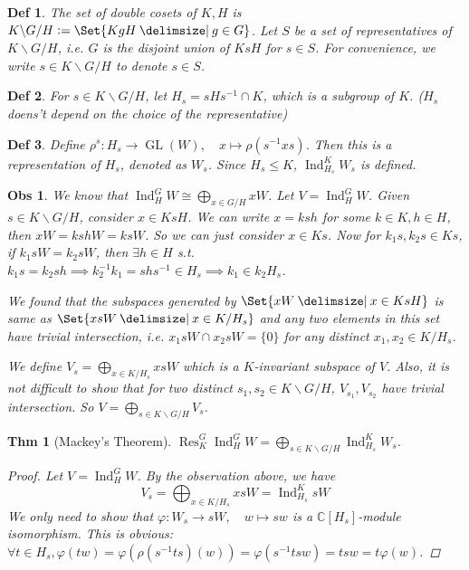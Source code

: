\documentclass[a4paper]{article}
\newcommand*{\defeq}{\vcentcolon=}
\newcommand*{\Cb}{\mathbb{C}}
\DeclareMathOperator{\Res}{Res}
\DeclareMathOperator{\Ind}{Ind}
\newcommand*\GL[1]{\operatorname{GL}\mathopen{}\left({#1}\right)\mathclose{}}
\newcommand*\bsl{\backslash}
\providecommand\given{}
\newcommand*\SetSymbol[1][]{%
  \nonscript\:#1\vert
  \allowbreak
  \nonscript\:
\mathopen{}}
\renewcommand\given{\SetSymbol[\delimsize]}
\renewcommand\given{\SetSymbol[\delimsize]}
\theoremstyle{mystyle}
\newtheorem{theorem}{Thm}
\newtheorem{observation}{Obs}
\newtheorem{definition}{Def}
\begin{document}
\begin{definition}
  The set of double cosets of $K, H$ is $K \bsl G / H \defeq
  \Set{ KgH \given g \in G}$.
  Let $S$ be a set of representatives of $K\bsl G/H$, i.e.
  $G$ is the disjoint union of $KsH$ for $s\in S$.
  For convenience, we write $s \in K\bsl G/H$ to denote $s\in S$.
\end{definition}

\begin{definition}
  For $s \in K\bsl G/H$, let $H_s = sHs^{-1} \cap K$,
  which is a subgroup of $K$.
  ($H_s$ doens't depend on the choice of the representative)
\end{definition}

\begin{definition}
  Define $\rho^s: H_s \to \GL{W}, \quad x \mapsto \rho(s^{-1}xs)$.
  Then this is a representation of $H_s$, denoted as $W_s$.
  Since $H_s \le K$, $\Ind^K_{H_s} W_s$ is defined.
\end{definition}

\begin{observation}
  We know that $\Ind^G_H W \cong \bigoplus_{x\in G/H} xW$. Let $V = \Ind^G_H W$.
  Given $s \in K\bsl G/H$, consider $x \in KsH$. We can write $x = ksh$ for
  some $k\in K, h \in H$, then $xW = kshW = ksW$. So we can just consider
  $x \in Ks$.
  Now for $k_1s, k_2s\in Ks$, if $k_1sW = k_2sW$, then $\exists h\in H$ s.t.
  $k_1s = k_2sh \implies k_2^{-1}k_1 = shs^{-1} \in H_s \implies
  k_1 \in k_2H_s$.

  We found that the subspaces generated by $\Set{ xW \given x\in KsH}$ is
  same as $\Set{ xsW \given x \in K/H_s}$ and any two elements in this
  set have trivial intersection, i.e. $x_1sW \cap x_2sW = \{0\}$ for any
  distinct $x_1, x_2 \in K/H_s$.

  We define $\displaystyle V_s = \bigoplus_{x\in K/H_s} xsW$ which is a
  $K$-invariant subspace of $V$. Also, it is not difficult to show that for
  two distinct $s_1, s_2 \in K\bsl G/H$, $V_{s_1}, V_{s_2}$ have trivial
  intersection. So $\displaystyle V = \bigoplus_{s\in K\bsl G/H} V_s$.
\end{observation}

\begin{theorem}[Mackey's Theorem]
  \label{thm:mackey}
  $\displaystyle \Res^G_K \Ind^G_H W = \bigoplus_{s\in K\bsl G/H} \Ind^K_{H_s} W_s$.
  \begin{proof}
    Let $V = \Ind^G_H W$. By the observation above, we have
    \[
      V_s = \bigoplus_{x\in K/H_s} xsW = \Ind^K_{H_s} sW
    \]
    We only need to show that $\varphi: W_s \to sW, \quad w \mapsto sw$
    is a $\Cb[H_s]$-module isomorphism.
    This is obvious: $\forall t\in H_s, \varphi(tw) = \varphi(\rho(s^{-1}ts)(w))
    = \varphi(s^{-1}tsw) = tsw = t\varphi(w)$.
  \end{proof}
\end{theorem}
\end{document}
